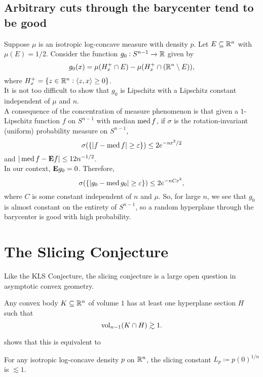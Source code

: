 \documentclass{article}
\begin{document}
	\subsection{Arbitrary cuts through the barycenter tend to be good}


		Suppose $\mu$ is an isotropic log-concave measure with density $p$. Let $E \subseteq \mathbb{R}^n$ with $\mu(E) = 1/2$. Consider the function $g_0 : S^{n-1} \to \mathbb{R}$ given by
		\[ g_0(x) = \mu(H_x^+ \cap E) - \mu(H_x^+ \cap (\mathbb{R}^n\setminus E)), \]
		where $H_x^+ = \{ z \in \mathbb{R}^n : \langle z , x \rangle \geq 0 \}$.\\
		It is not too difficult to show that $g_0$ is Lipschitz with a Lipschitz constant independent of $\mu$ and $n$.\\
		A consequence of the concentration of measure phenomenon is that given a $1$-Lipschitz function $f$ on $S^{n-1}$ with median $\operatorname{med} f$, if $\sigma$ is the rotation-invariant (uniform) probability measure on $S^{n-1}$,
		\[ \sigma ( \{ |f - \operatorname{med} f| \geq \varepsilon \} ) \leq 2e^{-n\varepsilon^2/2} \]
		and $|\operatorname{med} f - \textbf{E} f| \leq 12n^{-1/2}$.\\
		In our context, $\textbf{E} g_0 = 0$. Therefore,
		\[ \sigma ( \{ |g_0 - \operatorname{med} g_0| \geq \varepsilon \} ) \leq 2e^{-nC\varepsilon^2}, \]
		where $C$ is some constant independent of $n$ and $\mu$. So, for large $n$, we see that $g_0$ is almost constant on the entirety of $S^{n-1}$, so a random hyperplane through the barycenter is good with high probability.\\

\section{The Slicing Conjecture}

	
	Like the KLS Conjecture, the slicing conjecture is a large open question in asymptotic convex geometry.

	\begin{fcon}
		Any convex body $K\subseteq\mathbb{R}^n$ of volume $1$ has at least one hyperplane section $H$ such that
		\[ \operatorname{vol}_{n-1}(K \cap H) \gtrsim 1. \]
	\end{fcon}

	\cite{slicing-conjecture-equivalent} shows that this is equivalent to

	\begin{fcon}
		For any isotropic log-concave density $p$ on $\mathbb{R}^n$, the slicing constant $L_p \coloneqq p(0)^{1/n}$ is $\lesssim 1$.
	\end{fcon}
\end{document}
